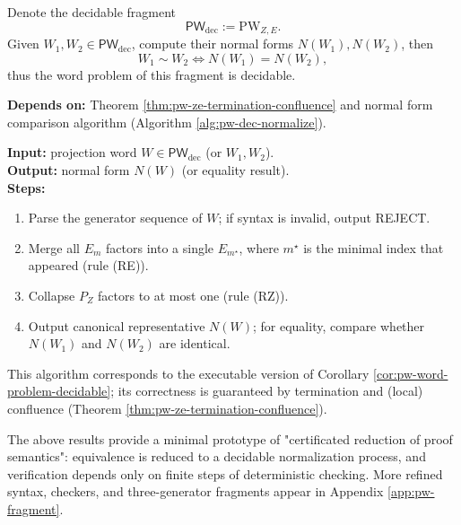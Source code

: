 \begin{corollary}\label{cor:pw-word-problem-decidable}
Denote the decidable fragment
$$
\mathsf{PW}_{\mathrm{dec}}:=\mathrm{PW}_{Z,E}.
$$
Given $W_1,W_2\in \mathsf{PW}_{\mathrm{dec}}$, compute their normal forms $N(W_1),N(W_2)$, then
$$
W_1\sim W_2 \iff N(W_1)=N(W_2),
$$
thus the word problem of this fragment is decidable.\par
\noindent\textnormal{\textbf{Depends on:} Theorem \ref{thm:pw-ze-termination-confluence} and normal form comparison algorithm (Algorithm \ref{alg:pw-dec-normalize}).}\par
\end{corollary}

\begin{algorithm}\label{alg:pw-dec-normalize}
\textbf{Input:} projection word $W\in\mathsf{PW}_{\mathrm{dec}}$ (or $W_1,W_2$).\\
\textbf{Output:} normal form $N(W)$ (or equality result).\\
\textbf{Steps:}
\begin{enumerate}
  \item Parse the generator sequence of $W$; if syntax is invalid, output REJECT.
  \item Merge all $E_m$ factors into a single $E_{m^\star}$, where $m^\star$ is the minimal index that appeared (rule (RE)).
  \item Collapse $P_Z$ factors to at most one (rule (RZ)).
  \item Output canonical representative $N(W)$; for equality, compare whether $N(W_1)$ and $N(W_2)$ are identical.
\end{enumerate}
This algorithm corresponds to the executable version of Corollary \ref{cor:pw-word-problem-decidable}; its correctness is guaranteed by termination and (local) confluence (Theorem \ref{thm:pw-ze-termination-confluence}).\par
\end{algorithm}

The above results provide a minimal prototype of "certificated reduction of proof semantics": equivalence is reduced to a decidable normalization process, and verification depends only on finite steps of deterministic checking. More refined syntax, checkers, and three-generator fragments appear in Appendix \ref{app:pw-fragment}.\par

